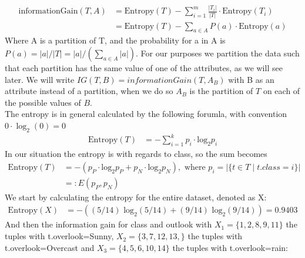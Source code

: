 \documentclass{article}
\theoremstyle{remark}
\begin{document}
	\begin{align*}
	\text{informationGain}(T,A)&=\text{Entropy}(T)-\sum^{m}_{i=1}\frac{|T_i|}{|T|}\cdot \text{Entropy}(T_i) \\
	&=\text{Entropy}(T)-\sum_{a\in A} P(a) \cdot \text{Entropy}(a)
	\end{align*}
	Where A is a partition of T, and the probability for a in A is $P(a) = |a|/|T| = |a|/(\sum_{a\in A} |a|)$. For our purposes we partition the data such that each partition has the same value of one of the attributes, as we will see later. We will write $IG(T,B) = informationGain(T,A_B)$ with B as an attribute instead of a partition, when we do so $A_B$ is the partition of $T$ on each of the possible values of $B$. 
	\\The entropy is in general calculated by the following forumla, with convention $0\cdot \log_2(0) = 0$
	\begin{align*}
	\text{Entropy}(T)&=-\sum^{k}_{i=1}p_i \cdot \text{log}_2 p_i
	\end{align*}
	In our situation the entropy is with regards to class, so the sum becomes
	\begin{align*}
	\text{Entropy}(T)&=-(p_P\cdot\text{log}_2 p_P + p_N\cdot\text{log}_2 p_N), \text{ where } p_i = |\{t\in T \mid t.class = i\}|\\
	&=: E(p_P,p_N)
	\end{align*}
	We start by calculating the entropy for the entire dataset, denoted as X: 
	\begin{align*}
	\text{Entropy}(X)&=-( (5 / 14) \text{ log}_2( 5/14)+ (9 / 14) \text{ log}_2( 9/14))=0.9403
	\end{align*}
	And then the information gain for class and outlook with $X_1= \{1,2,8,9,11\}$ the tuples with t.overlook=Sunny, $X_2=\{3,7,12,13,\}$ the tuples with t.overlook=Overcast and $X_3=\{4,5,6,10,14\}$ the tuples with t.overlook=rain: 
\end{document}
